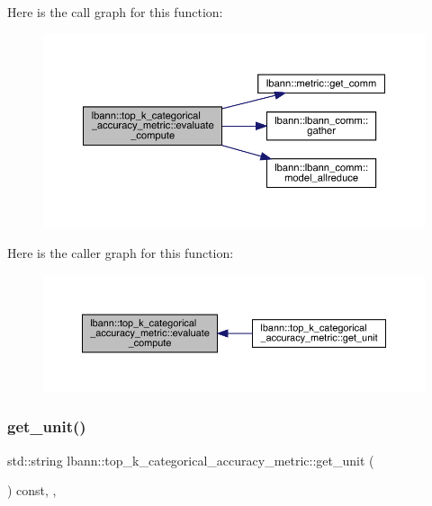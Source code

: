 Here is the call graph for this function\+:\nopagebreak
\begin{figure}[H]
\begin{center}
\leavevmode
\includegraphics[width=350pt]{classlbann_1_1top__k__categorical__accuracy__metric_a3449bdb835e7e5bd7d17cd001fb4ae38_cgraph}
\end{center}
\end{figure}
Here is the caller graph for this function\+:\nopagebreak
\begin{figure}[H]
\begin{center}
\leavevmode
\includegraphics[width=350pt]{classlbann_1_1top__k__categorical__accuracy__metric_a3449bdb835e7e5bd7d17cd001fb4ae38_icgraph}
\end{center}
\end{figure}
\mbox{\label{classlbann_1_1top__k__categorical__accuracy__metric_a0531d4f199fa61ce448af8c945ff3dfc}} 
\subsubsection{\texorpdfstring{get\+\_\+unit()}{get\_unit()}}
{\footnotesize\ttfamily std\+::string lbann\+::top\+\_\+k\+\_\+categorical\+\_\+accuracy\+\_\+metric\+::get\+\_\+unit (\begin{DoxyParamCaption}{ }\end{DoxyParamCaption}) const\hspace{0.3cm}{\ttfamily [inline]}, {\ttfamily [override]}, {\ttfamily [virtual]}}


